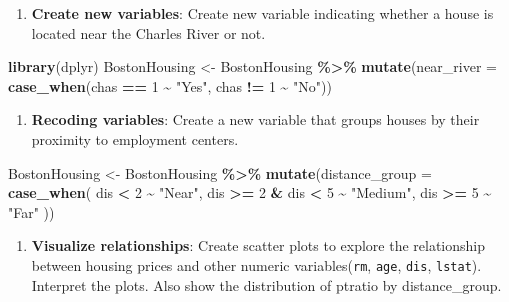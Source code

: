 \documentclass[
]{book}
\newenvironment{Shaded}{\begin{snugshade}}{\end{snugshade}}
\newcommand{\AttributeTok}[1]{\textcolor[rgb]{0.13,0.29,0.53}{#1}}
\newcommand{\DecValTok}[1]{\textcolor[rgb]{0.00,0.00,0.81}{#1}}
\newcommand{\FunctionTok}[1]{\textcolor[rgb]{0.13,0.29,0.53}{\textbf{#1}}}
\newcommand{\NormalTok}[1]{#1}
\newcommand{\OtherTok}[1]{\textcolor[rgb]{0.56,0.35,0.01}{#1}}
\newcommand{\SpecialCharTok}[1]{\textcolor[rgb]{0.81,0.36,0.00}{\textbf{#1}}}
\newcommand{\StringTok}[1]{\textcolor[rgb]{0.31,0.60,0.02}{#1}}
\providecommand{\tightlist}{%
  \setlength{\itemsep}{0pt}\setlength{\parskip}{0pt}}
\begin{document}
\begin{enumerate}
\def\labelenumi{\arabic{enumi}.}
\setcounter{enumi}{4}
\tightlist
\item
  \textbf{Create new variables}: Create new variable indicating whether a house is located near the Charles River or not.
\end{enumerate}

\begin{Shaded}
\begin{Highlighting}[]
\FunctionTok{library}\NormalTok{(dplyr)}
\NormalTok{BostonHousing }\OtherTok{\textless{}{-}}\NormalTok{ BostonHousing }\SpecialCharTok{\%\textgreater{}\%}
  \FunctionTok{mutate}\NormalTok{(}\AttributeTok{near\_river =} \FunctionTok{case\_when}\NormalTok{(chas }\SpecialCharTok{==} \DecValTok{1} \SpecialCharTok{\textasciitilde{}} \StringTok{"Yes"}\NormalTok{,}
\NormalTok{                                chas }\SpecialCharTok{!=} \DecValTok{1} \SpecialCharTok{\textasciitilde{}} \StringTok{"No"}\NormalTok{))}
\end{Highlighting}
\end{Shaded}

\begin{enumerate}
\def\labelenumi{\arabic{enumi}.}
\setcounter{enumi}{5}
\tightlist
\item
  \textbf{Recoding variables}: Create a new variable that groups houses by their proximity to employment centers.
\end{enumerate}

\begin{Shaded}
\begin{Highlighting}[]
\NormalTok{BostonHousing }\OtherTok{\textless{}{-}}\NormalTok{ BostonHousing }\SpecialCharTok{\%\textgreater{}\%}
  \FunctionTok{mutate}\NormalTok{(}\AttributeTok{distance\_group =} \FunctionTok{case\_when}\NormalTok{(}
\NormalTok{    dis }\SpecialCharTok{\textless{}} \DecValTok{2} \SpecialCharTok{\textasciitilde{}} \StringTok{"Near"}\NormalTok{,}
\NormalTok{    dis }\SpecialCharTok{\textgreater{}=} \DecValTok{2} \SpecialCharTok{\&}\NormalTok{ dis }\SpecialCharTok{\textless{}} \DecValTok{5} \SpecialCharTok{\textasciitilde{}} \StringTok{"Medium"}\NormalTok{,}
\NormalTok{    dis }\SpecialCharTok{\textgreater{}=} \DecValTok{5} \SpecialCharTok{\textasciitilde{}} \StringTok{"Far"}
\NormalTok{  ))}
\end{Highlighting}
\end{Shaded}

\begin{enumerate}
\def\labelenumi{\arabic{enumi}.}
\setcounter{enumi}{6}
\tightlist
\item
  \textbf{Visualize relationships}: Create scatter plots to explore the relationship between housing prices and other numeric variables(\texttt{rm}, \texttt{age}, \texttt{dis}, \texttt{lstat}). Interpret the plots. Also show the distribution of ptratio by distance\_group.
\end{enumerate}
\end{document}
